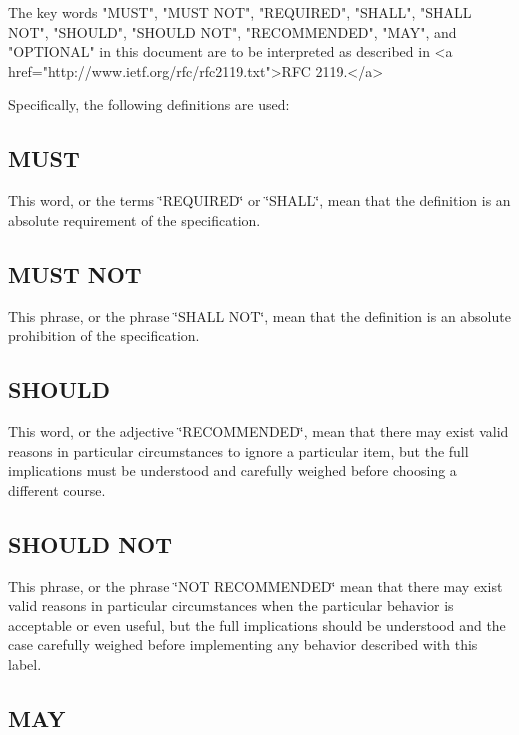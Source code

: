 \begin{DoxyVerb}  The key words "MUST", "MUST NOT", "REQUIRED", "SHALL", "SHALL
  NOT", "SHOULD", "SHOULD NOT", "RECOMMENDED",  "MAY", and
  "OPTIONAL" in this document are to be interpreted as described in
  <a href="http://www.ietf.org/rfc/rfc2119.txt">RFC 2119.</a>
\end{DoxyVerb}


Specifically, the following definitions are used\-:\hypertarget{rfc2119_MUST}{}\subsection{M\-U\-S\-T}\label{rfc2119_MUST}
\label{rfc2119_REQUIRED}%
\hypertarget{rfc2119_REQUIRED}{}%
\label{rfc2119_SHALL}%
\hypertarget{rfc2119_SHALL}{}%
 This word, or the terms \char`\"{}\-R\-E\-Q\-U\-I\-R\-E\-D\char`\"{} or \char`\"{}\-S\-H\-A\-L\-L\char`\"{}, mean that the definition is an absolute requirement of the specification.\hypertarget{rfc2119_MUSTNOT}{}\subsection{M\-U\-S\-T N\-O\-T}\label{rfc2119_MUSTNOT}
\label{rfc2119_SHALLNOT}%
\hypertarget{rfc2119_SHALLNOT}{}%
 This phrase, or the phrase \char`\"{}\-S\-H\-A\-L\-L N\-O\-T\char`\"{}, mean that the definition is an absolute prohibition of the specification.\hypertarget{rfc2119_SHOULD}{}\subsection{S\-H\-O\-U\-L\-D}\label{rfc2119_SHOULD}
\label{rfc2119_RECOMMENDED}%
\hypertarget{rfc2119_RECOMMENDED}{}%
 This word, or the adjective \char`\"{}\-R\-E\-C\-O\-M\-M\-E\-N\-D\-E\-D\char`\"{}, mean that there may exist valid reasons in particular circumstances to ignore a particular item, but the full implications must be understood and carefully weighed before choosing a different course.\hypertarget{rfc2119_SHOULDNOT}{}\subsection{S\-H\-O\-U\-L\-D N\-O\-T}\label{rfc2119_SHOULDNOT}
\label{rfc2119_NOTRECOMMENDED}%
\hypertarget{rfc2119_NOTRECOMMENDED}{}%
 This phrase, or the phrase \char`\"{}\-N\-O\-T R\-E\-C\-O\-M\-M\-E\-N\-D\-E\-D\char`\"{} mean that there may exist valid reasons in particular circumstances when the particular behavior is acceptable or even useful, but the full implications should be understood and the case carefully weighed before implementing any behavior described with this label.\hypertarget{rfc2119_MAY}{}\subsection{M\-A\-Y}\label{rfc2119_MAY}
